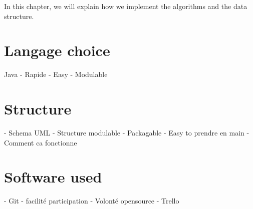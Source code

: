In this chapter, we will explain how we implement the algorithms and the data structure. 


\section{Langage choice}

Java 
	- Rapide
	- Easy
	- Modulable

\section{Structure}

- Schema UML
	- Structure modulable
	- Packagable
	- Easy to prendre en main
	- Comment ca fonctionne

\section{Software used}

	- Git
		- facilité participation
		- Volonté opensource
	- Trello